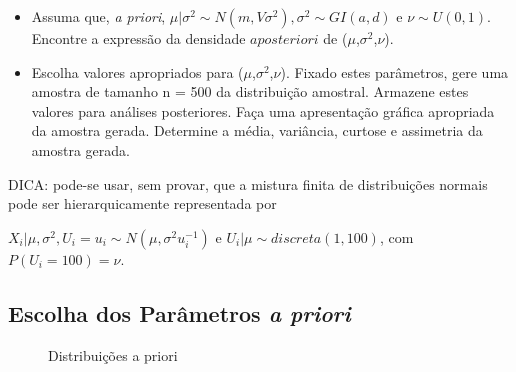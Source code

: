 \documentclass[12pt,reqno,a4paper,oneside]{report}
\begin{document}
\begin{itemize}
	\item Assuma que, \textit{a priori}, $\mu|\sigma^2\sim{N}(m,V\sigma^2),\sigma^2\sim{GI}(a,d)$ e $\nu\sim{U}(0,1)$. Encontre a expressão da densidade $a posteriori$ de ($\mu$,$\sigma^2$,$\nu$).
	\item Escolha valores apropriados para ($\mu$,$\sigma^2$,$\nu$). Fixado estes parâmetros, gere uma amostra de tamanho n = 500 da distribuição amostral. Armazene estes valores para análises posteriores. Faça uma apresentação gráfica apropriada da amostra gerada. Determine a média, variância, curtose e assimetria da amostra gerada.
\end{itemize}

DICA: pode-se usar, sem provar, que a mistura finita de distribuições normais pode ser hierarquicamente representada por 

$X_i|\mu,\sigma^2,U_{i}=u_i\sim{N}(\mu,\sigma^2u_i^{-1})$ e $U_i|\mu\sim{discreta}(1,100)$, com $P(U_i=100)=\nu$.

\subsection*{Escolha dos Parâmetros \textit{a priori}}


\begin{figure}[!htb]
	\centering
	\caption{Distribuições a priori}
	\label{fig:priori}
\end{figure}
\end{document}
